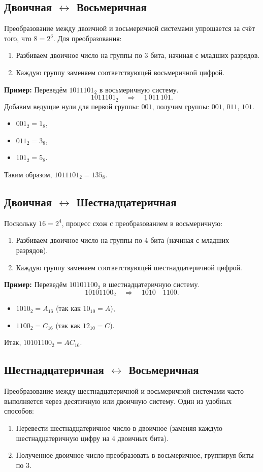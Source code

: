 \documentclass[12pt,a4paper]{article}
\begin{document}
\subsection{Двоичная \(\leftrightarrow\) Восьмеричная}
Преобразование между двоичной и восьмеричной системами упрощается за счёт того, что \(8 = 2^3\). Для преобразования:
\begin{enumerate}
    \item Разбиваем двоичное число на группы по 3 бита, начиная с младших разрядов.
    \item Каждую группу заменяем соответствующей восьмеричной цифрой.
\end{enumerate}

\textbf{Пример:} Переведём \(1011101_2\) в восьмеричную систему.
\[
1011101_2 \quad \Rightarrow \quad \underline{1}\, 011\, 101.
\]
Добавим ведущие нули для первой группы: \(001\), получим группы: \(001\), \(011\), \(101\).
\begin{itemize}
    \item \(001_2 = 1_8\),
    \item \(011_2 = 3_8\),
    \item \(101_2 = 5_8\).
\end{itemize}
Таким образом, \(1011101_2 = 135_8\).

\subsection{Двоичная \(\leftrightarrow\) Шестнадцатеричная}
Поскольку \(16 = 2^4\), процесс схож с преобразованием в восьмеричную:
\begin{enumerate}
    \item Разбиваем двоичное число на группы по 4 бита (начиная с младших разрядов).
    \item Каждую группу заменяем соответствующей шестнадцатеричной цифрой.
\end{enumerate}

\textbf{Пример:} Переведём \(10101100_2\) в шестнадцатеричную систему.
\[
10101100_2 \quad \Rightarrow \quad 1010 \quad 1100.
\]
\begin{itemize}
    \item \(1010_2 = A_{16}\) (так как \(10_{10}=A\)),
    \item \(1100_2 = C_{16}\) (так как \(12_{10}=C\)).
\end{itemize}
Итак, \(10101100_2 = AC_{16}\).

\subsection{Шестнадцатеричная \(\leftrightarrow\) Восьмеричная}
Преобразование между шестнадцатеричной и восьмеричной системами часто выполняется через десятичную или двоичную систему. Один из удобных способов:
\begin{enumerate}
    \item Перевести шестнадцатеричное число в двоичное (заменяя каждую шестнадцатеричную цифру на 4 двоичных бита).
    \item Полученное двоичное число преобразовать в восьмеричное, группируя биты по 3.
\end{enumerate}
\end{document}

